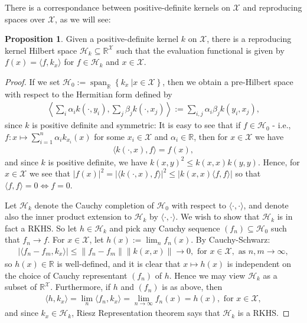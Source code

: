 \documentclass[10pt,twoside,openany,final]{memoir}
\theoremstyle{definition}
\newtheorem{proposition}[theorem]{Proposition}
\theoremstyle{Break}
\newcommand{\lv}{\left\lVert}
\newcommand{\rv}{\right\rVert}
\newcommand{\R}{\mathbb{R}}
\renewcommand{\H}{\mathcal{H}}
\DeclareMathOperator{\Span}{span}
\begin{document}
There is a correspondance between positive-definite kernels on $\mathcal{X}$ and reproducing spaces over $\mathcal{X}$, as we will see:
\begin{proposition}
	Given a positive-definite kernel $k$ on $\mathcal{X}$, there is a reproducing kernel Hilbert space $\H_k\subseteq \R^{\mathcal{X}}$ such that the evaluation functional is given by $f(x) = \langle f, k_x\rangle$ for $f \in \H_k$ and $x \in \mathcal{X}$.
	\label{moore}
\end{proposition}
\begin{proof}
	If we set $\H_0 := \Span_\R\left\{ k_x \ \big| x \in \mathcal{X} \right\}$, then we obtain a pre-Hilbert space with respect to the Hermitian form defined by
	\begin{align*}
		\left\langle \sum_i \alpha_i k(\cdot , y_i) , \sum_j \beta_j k(\cdot, x_j) \right\rangle := \sum_{i,j}\alpha_i \beta_j  k(y_i,x_j),
	\end{align*}
	since $k$ is positive definite and symmetric: It is easy to see that if $f \in \H_0$ - i.e., $f \colon x \mapsto \sum_{i=1}^n \alpha_i k_{x_i}(x)$ for some $x_i \in \mathcal{X}$ and $\alpha_i \in \R$, then for $x \in \mathcal{X}$ we have
	\begin{align*}
		\langle k(\cdot , x ) , f \rangle = f(x),
	\end{align*}
	and since $k$ is positive definite, we have $k(x,y)^2 \leq k(x,x)k(y,y)$. Hence, for $x \in \mathcal{X}$ we see that $|f(x)|^2=|\langle k(\cdot , x ) , f \rangle|^2 \leq | k(x,x) \langle f,f \rangle|$ so that $\langle f,f \rangle = 0 \iff f=0$.

	Let $\H_k$ denote the Cauchy completion of $\H_0$ with respect to $\langle \cdot , \cdot \rangle$, and denote also the inner product extension to $\H_k$ by $\langle \cdot , \cdot \rangle$. We wish to show that $\H_k$ is in fact a RKHS. So let $h \in \H_k$ and pick any Cauchy sequence $(f_n) \subseteq \H_0$ such that $f_n \to f$. For $x \in \mathcal{X}$, let $h(x) := \lim_n f_n(x)$. By Cauchy-Schwarz:
	\begin{align*}
		|\langle f_n - f_m , k_x\rangle| \leq \lv f_n - f_m \rv \lv k(x,x)\rv \to 0, \text{ for } x \in \mathcal{X},\text{ as }n,m \to \infty,
	\end{align*}
	so $h(x) \in \R$ is well-defined, and it is clear that $x \mapsto h(x)$ is independent on the choice of Cauchy representant $(f_n)$ of $h$. Hence we may view $\H_k$ as a subset of $\R^{\mathcal{X}}$.
	Furthermore, if $h$ and $(f_n)$ is as above, then 
	\begin{align*}
		\langle h , k_x \rangle = \lim_n \langle f_n , k_x \rangle = \lim_{n\to \infty} f_n(x) =h(x), \text{ for } x \in \mathcal{X}, 
	\end{align*}
	and since $k_x \in \H_k$, Riesz Representation theorem says that $\H_k$ is a RKHS.
\end{proof}
\end{document}
